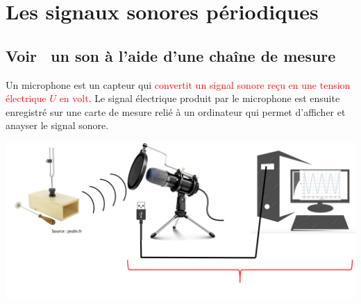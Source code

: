
\section{Les signaux sonores périodiques}
\subsection{\og Voir \fg ~un son à l'aide d'une chaîne de mesure}
\begin{tcolorbox}[colback=green!5!white,colframe=green!75!black,title=\textbf{Microphone et enregistrement:}]
Un microphone est un capteur qui \textcolor{red}{convertit un signal sonore reçu en une tension électrique $U$ en volt}. Le signal électrique produit par le microphone est ensuite enregistré sur une carte de mesure relié à un ordinateur qui permet d'afficher et anayser le signal sonore.
\begin{center}
    \includegraphics[scale = 0.5]{Images/Chaine_mesure_acompleter.png}
\end{center}
\end{tcolorbox}
